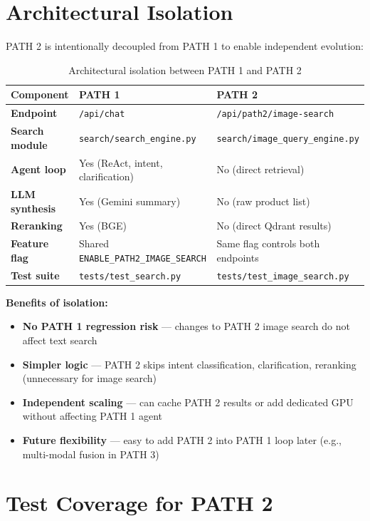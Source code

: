 \section{Architectural Isolation}

PATH 2 is intentionally decoupled from PATH 1 to enable independent evolution:

\begin{table}[H]
\centering
\begin{tabular}{lll}
\toprule
\textbf{Component} & \textbf{PATH 1} & \textbf{PATH 2}\\
\midrule
\textbf{Endpoint} & \texttt{/api/chat} & \texttt{/api/path2/image-search} \\
\textbf{Search module} & \texttt{search/search\_engine.py} & \texttt{search/image\_query\_engine.py} \\
\textbf{Agent loop} & Yes (ReAct, intent, clarification) & No (direct retrieval) \\
\textbf{LLM synthesis} & Yes (Gemini summary) & No (raw product list) \\
\textbf{Reranking} & Yes (BGE) & No (direct Qdrant results) \\
\textbf{Feature flag} & Shared \texttt{ENABLE\_PATH2\_IMAGE\_SEARCH} & Same flag controls both endpoints \\
\textbf{Test suite} & \texttt{tests/test\_search.py} & \texttt{tests/test\_image\_search.py} \\
\bottomrule
\end{tabular}
\caption{Architectural isolation between PATH 1 and PATH 2}
\label{tab:path_isolation}
\end{table}

\textbf{Benefits of isolation:}
\begin{itemize}
    \item \textbf{No PATH 1 regression risk} --- changes to PATH 2 image search do not affect text search
    \item \textbf{Simpler logic} --- PATH 2 skips intent classification, clarification, reranking (unnecessary for image search)
    \item \textbf{Independent scaling} --- can cache PATH 2 results or add dedicated GPU without affecting PATH 1 agent
    \item \textbf{Future flexibility} --- easy to add PATH 2 into PATH 1 loop later (e.g., multi-modal fusion in PATH 3)
\end{itemize}

\section{Test Coverage for PATH 2}

